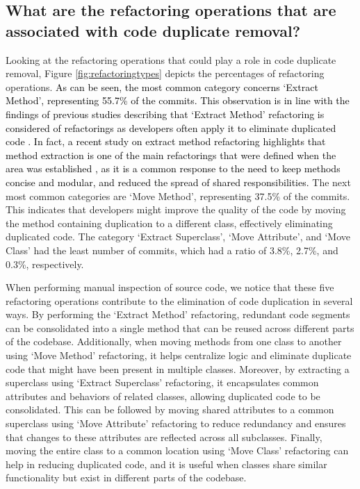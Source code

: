 \subsection{What are the refactoring operations that are associated with code duplicate removal?}

Looking at the refactoring operations that could play a role in code duplicate removal, Figure \ref{fig:refactoringtypes} depicts the percentages of refactoring operations. \textcolor{black}{As can be seen, the most common category concerns `Extract Method', representing 55.7\% of the commits. This observation is in line with the findings of previous studies describing that `Extract Method' refactoring is considered  of
refactorings as developers often apply it to eliminate duplicated code \citep{higo2004aries,higo2005aries,higo2008metric,tairas2012increasing,bian2013spape,yue2018automatic,yoshida2019proactive,arcelli2015duplicated,alomar2022anticopypaster,alomar2023just,alomar2024behind}. In fact, a recent study on extract method refactoring highlights that method extraction is one of the main refactorings that were defined when the area was established \citep{alomar2024behind,griswold1993automated}, as it is a common response to the need to keep methods concise and modular, and reduced the spread of shared responsibilities.} The next most common categories are `Move Method', representing 37.5\% of the commits. This indicates that developers might improve the quality of the code by moving the method containing duplication to a different class, effectively eliminating duplicated code. The category `Extract Superclass', `Move Attribute', and `Move Class' had the least number of commits, which had a ratio of 3.8\%, 2.7\%, and 0.3\%, respectively. 

When performing manual inspection of source code, we notice that these five refactoring operations contribute to the elimination of code duplication in several ways. By performing the `Extract Method' refactoring, redundant code segments can be consolidated into a single method that can be reused across different parts of the codebase. Additionally, when moving methods from one class to another using `Move Method' refactoring, it helps centralize logic and eliminate duplicate code that might have been present in multiple classes. Moreover, by extracting a superclass using `Extract Superclass' refactoring, it encapsulates common attributes and behaviors of related classes, allowing duplicated code to be consolidated. This can be followed by moving shared attributes to a common superclass using `Move Attribute' refactoring to reduce redundancy and ensures that changes to these attributes are reflected across all subclasses. Finally, moving the entire class to a common location using `Move Class' refactoring can help in reducing duplicated code, and it is useful when classes share similar functionality but exist in different parts of the codebase.

